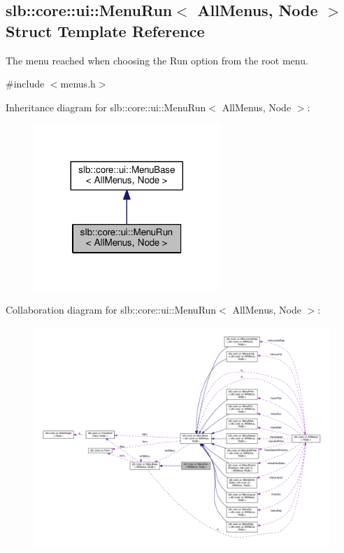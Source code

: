 \hypertarget{structslb_1_1core_1_1ui_1_1MenuRun}{}\subsection{slb\+:\+:core\+:\+:ui\+:\+:Menu\+Run$<$ All\+Menus, Node $>$ Struct Template Reference}
\label{structslb_1_1core_1_1ui_1_1MenuRun}


The menu reached when choosing the Run option from the root menu.  




{\ttfamily \#include $<$menus.\+h$>$}



Inheritance diagram for slb\+:\+:core\+:\+:ui\+:\+:Menu\+Run$<$ All\+Menus, Node $>$\+:\nopagebreak
\begin{figure}[H]
\begin{center}
\leavevmode
\includegraphics[width=200pt]{structslb_1_1core_1_1ui_1_1MenuRun__inherit__graph}
\end{center}
\end{figure}


Collaboration diagram for slb\+:\+:core\+:\+:ui\+:\+:Menu\+Run$<$ All\+Menus, Node $>$\+:\nopagebreak
\begin{figure}[H]
\begin{center}
\leavevmode
\includegraphics[width=350pt]{structslb_1_1core_1_1ui_1_1MenuRun__coll__graph}
\end{center}
\end{figure}
